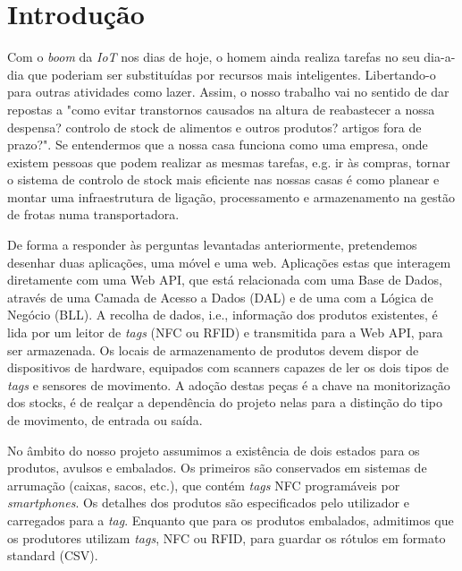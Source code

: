 %
%
\chapter*{Introdução} \label{Introducao}

Com o \textit{boom} da \textit{IoT} nos dias de hoje, o homem ainda realiza tarefas no seu dia-a-dia que poderiam ser substituídas por recursos mais inteligentes. Libertando-o para outras atividades como lazer. Assim, o nosso trabalho vai no sentido de dar repostas a "como evitar transtornos causados na altura de reabastecer a nossa despensa? controlo de stock de alimentos e outros produtos? artigos fora de prazo?". Se entendermos que a nossa casa funciona como uma empresa, onde existem pessoas que podem realizar as mesmas tarefas, e.g. ir às compras, tornar o sistema de controlo de stock mais eficiente nas nossas casas é como planear e montar uma infraestrutura de ligação, processamento e armazenamento na gestão de frotas numa transportadora.

De forma a responder às perguntas levantadas anteriormente, pretendemos desenhar duas aplicações, uma móvel e uma web. Aplicações estas que interagem diretamente com uma Web API, que está relacionada com uma Base de Dados, através de uma Camada de Acesso a Dados (DAL) e de uma com a Lógica de Negócio (BLL). A recolha de dados, i.e., informação dos produtos existentes, é lida por um leitor de {\itshape tags} (NFC ou RFID) e transmitida para a Web API, para ser armazenada. Os locais de armazenamento de produtos devem dispor de dispositivos de hardware, equipados com scanners capazes de ler os dois tipos de {\itshape tags} e sensores de movimento. A adoção destas peças é a chave na monitorização dos stocks, é de realçar a dependência do projeto nelas para a distinção do tipo de movimento, de entrada ou saída.

No âmbito do nosso projeto assumimos a existência de dois estados para os produtos, avulsos e embalados. Os primeiros são conservados em sistemas de arrumação (caixas, sacos, etc.), que contém {\itshape tags} NFC programáveis por {\itshape smartphones}. Os detalhes dos produtos são especificados pelo utilizador e carregados para a {\itshape tag}. Enquanto que para os produtos embalados, admitimos que os produtores utilizam {\itshape tags}, NFC ou RFID, para guardar os rótulos em formato standard (CSV).